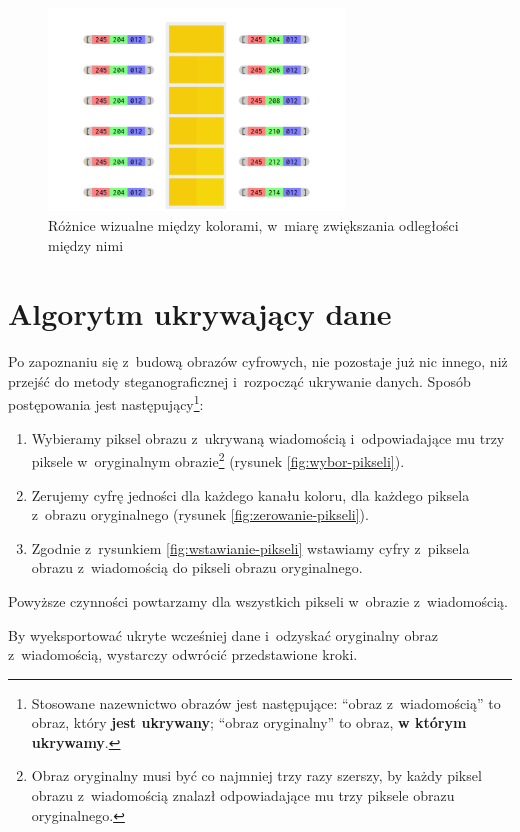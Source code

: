 \documentclass[12pt,a4paper]{article}
\begin{document}
    \begin{figure}[!h]
        \centering
        \includegraphics[width=0.7\textwidth]{pieces/kolory}
        \caption{Różnice wizualne między kolorami, w~miarę zwiększania odległości między nimi} \label{fig:kolory}
    \end{figure}

\section{Algorytm ukrywający dane}
    Po zapoznaniu się z~budową obrazów cyfrowych, nie pozostaje już nic innego, niż przejść do metody steganograficznej i~rozpocząć ukrywanie danych. Sposób postępowania jest następujący\footnote{Stosowane nazewnictwo obrazów jest następujące: ``obraz z~wiadomością'' to obraz, który \textbf{jest ukrywany}; ``obraz oryginalny'' to obraz, \textbf{w którym ukrywamy}.}:
    \begin{enumerate}
        \item Wybieramy piksel obrazu z~ukrywaną wiadomością i~odpowiadające mu trzy piksele w~oryginalnym obrazie\footnote{Obraz oryginalny musi być co najmniej trzy razy szerszy, by każdy piksel obrazu z~wiadomością znalazł odpowiadające mu trzy piksele obrazu oryginalnego.} (rysunek \ref{fig:wybor-pikseli}).
        \item Zerujemy cyfrę jedności dla każdego kanału koloru, dla każdego piksela z~obrazu oryginalnego (rysunek \ref{fig:zerowanie-pikseli}).
        \item Zgodnie z~rysunkiem \ref{fig:wstawianie-pikseli} wstawiamy cyfry z~piksela obrazu z~wiadomością do pikseli obrazu oryginalnego.
    \end{enumerate}
    Powyższe czynności powtarzamy dla wszystkich pikseli w~obrazie z~wiadomością.

    By wyeksportować ukryte wcześniej dane i~odzyskać oryginalny obraz z~wiadomością, wystarczy odwrócić przedstawione kroki.
\end{document}

